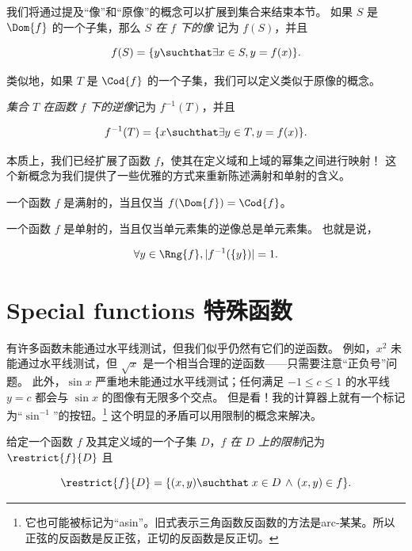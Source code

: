 我们将通过提及“像”和“原像”的概念可以扩展到集合来结束本节。
如果 $S$ 是 $\Dom{f}$ 的一个子集，那么 \emph{$S$ 在 $f$ 下的像} 记为 $f(S)$，并且

\[ f(S) = \{ y \suchthat \exists x \in S, y = f(x) \}. \]

类似地，如果 $T$ 是 $\Cod{f}$ 的一个子集，我们可以定义类似于原像的概念。

\emph{集合 $T$ 在函数 $f$ 下的逆像}记为 $f^{-1}(T)$，并且

\[ f^{-1}(T) = \{ x \suchthat \exists y \in T, y=f(x) \}.\]

本质上，我们已经扩展了函数 $f$，使其在定义域和上域的幂集之间进行映射！
这个新概念为我们提供了一些优雅的方式来重新陈述满射和单射的含义。

一个函数 $f$ 是满射的，当且仅当 $f(\Dom{f}) = \Cod{f}$。

一个函数 $f$ 是单射的，当且仅当单元素集的逆像总是单元素集。
也就是说，

\[ \forall y \in \Rng{f}, |f^{-1}(\{y\})| = 1.
\] 

\newpage




\newpage

\section{Special functions 特殊函数}
\label{sec:special_functions}


有许多函数未能通过水平线测试，但我们似乎仍然有它们的逆函数。
例如，$x^2$ 未能通过水平线测试，但 $\sqrt{x}$ 是一个相当合理的逆函数——只需要注意“正负号”问题。
此外，$\sin{x}$ 严重地未能通过水平线测试；任何满足 $-1 \leq c \leq 1$ 的水平线 $y=c$ 都会与 $\sin{x}$ 的图像有无限多个交点。
但是看！我的计算器上就有一个标记为“$\sin^{-1}$”的按钮。\footnote{它也可能被标记为“asin”。旧式表示三角函数反函数的方法是arc-某某。所以正弦的反函数是反正弦，正切的反函数是反正切。} 这个明显的矛盾可以用限制的概念来解决。

\begin{defi}
给定一个函数 $f$ 及其定义域的一个子集 $D$，\emph{$f$ 在 $D$ 上的限制}记为 $\restrict{f}{D}$ 且

\[ \restrict{f}{D} = \{ (x,y) \suchthat \; x \in D \, \land \, (x,y) \in f \}. \]
\end{defi}

